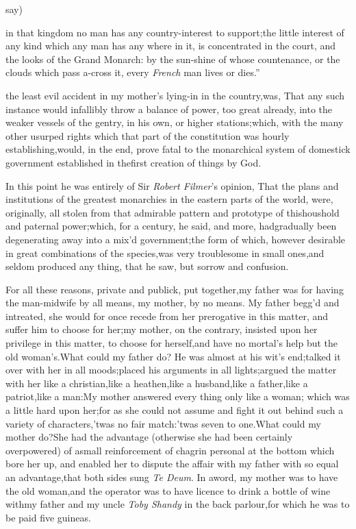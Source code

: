 \documentclass{article}
\begin{document}
\noindent
say) 
\begin{story}{in that kingdom no man has any} country-interest to
support;\tsk  the little interest of any kind which any man has any where in
it, is concentrated in the court, and the looks of the Grand Monarch: by the
sun-shine of whose countenance, or the clouds which pass a-cross it, every
\textit{French} man lives or dies.”
\end{story}

\vspace\parskip
\noindent
{}
\pb 
the least evil accident in my mother’s lying-in
in the country,\tsh  was, That any such instance would
infallibly throw a balance of power, too great already,\break
into the weaker vessels of the gentry, in his own, or higher
stations;\tsh  which, with the many other usurped rights\break
which that part of the constitution was hourly
establishing,\tsk  would, in the end, prove fatal to the monarchical system of domestick
government established in the\break first creation of things by God.

In this point he was entirely of Sir \textit{Robert
Filmer}’s opinion, That the plans and institutions of the
greatest monarchies in the eastern parts of the world, were,
originally, all stolen from that admirable pattern and prototype of
this\break houshold and paternal power;\tsk  which, for a century, he
said, and more, had\pb gradually been degenerating away into a
mix’d government;\tsh  the form of which, however
desirable in great combinations of the species,\tsh  was
very troublesome in small ones,\tsk  and seldom produced any
thing, that he saw, but sorrow and confusion.

For all these reasons, private and pub\-lick, put
together,\tsk  my father was for having the man-midwife by all
means,\tsk\break
my mother, by no means. My father begg’d and
intreated, she would for once recede from her prerogative in this
matter, and suffer him to choose for her;\tsk\break  my mother, on the
contrary, insisted up\-on her privilege in this matter, to choose for
herself,\tsk  and have no mortal’s help but the old
woman’s.\tsk  What could my father do? He was almost at his
wit’s end;\tsh  talked it over with her in all\pb
moods;\tsk  placed his arguments in all lights;\tsk  argued the
matter with her like a christian,\tsk  like a heathen,\tsk  like
a husband,\tsk  like a father,\tsk  like a patriot,\tsk  like a
man:\tsk  My mother answered every thing only like a woman; which
was a little hard upon her;\tsk  for as she could not assume and
fight it out behind such a variety of characters,\tsk\break  ’twas
no fair match:\tsk  ’twas seven to one.\tsk  What could my
mother do?\tsk\break  She had the advantage (otherwise she had been
certainly overpowered) of a\break small reinforcement of chagrin personal
at the bottom which bore her up, and enabled her to dispute the
affair with my father with so equal an advantage,\tsh\break  that
both sides sung \textit{Te Deum}. In a\break word, my mother was to have
the old woman,\tsk  and the operator was to have licence to drink
a bottle of wine with\pb my father and my uncle \textit{Toby Shandy} in the back
parlour,\tsk  for which he was to be paid five guineas.
\end{document}
